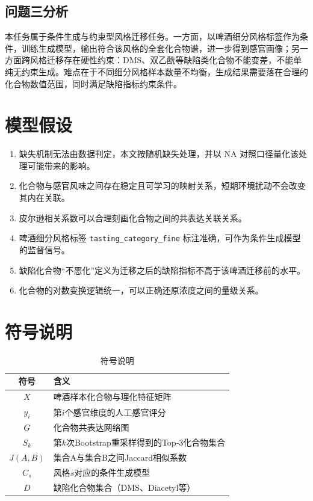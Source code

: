 \documentclass[12pt,a4paper]{article}
\begin{document}
\subsection{问题三分析}
本任务属于条件生成与约束型风格迁移任务。一方面，以啤酒细分风格标签作为条件，训练生成模型，输出符合该风格的全套化合物谱，进一步得到感官画像；另一方面跨风格迁移存在硬性约束：DMS、双乙酰等缺陷类化合物不能变差，不能单纯无约束生成。难点在于不同细分风格样本数量不均衡，生成结果需要落在合理的化合物数值范围，同时满足缺陷指标约束条件。

\section{模型假设}
\begin{enumerate}[label=\arabic*.,leftmargin=2.5em]
    \item 缺失机制无法由数据判定，本文按随机缺失处理，并以 NA 对照口径量化该处理可能带来的影响。
    \item 化合物与感官风味之间存在稳定且可学习的映射关系，短期环境扰动不会改变其内在关联。
    \item 皮尔逊相关系数可以合理刻画化合物之间的共表达关联关系。
    \item 啤酒细分风格标签 \texttt{tasting\_category\_fine} 标注准确，可作为条件生成模型的监督信号。
    \item 缺陷化合物``不恶化''定义为迁移之后的缺陷指标不高于该啤酒迁移前的水平。
    \item 化合物的对数变换逻辑统一，可以正确还原浓度之间的量级关系。
\end{enumerate}

\section{符号说明}
\begin{table}[htbp]
    \centering
    \begin{tabular}{c p{7cm}}
        \toprule
        符号 & 含义 \\
        \midrule
        $X$ & 啤酒样本化合物与理化特征矩阵 \\
        $y_i$ & 第$i$个感官维度的人工感官评分 \\
        $G$ & 化合物共表达网络图 \\
        $S_k$ & 第$k$次Bootstrap重采样得到的Top‑3化合物集合 \\
        $J(A,B)$ & 集合A与集合B之间Jaccard相似系数 \\
        $C_s$ & 风格$s$对应的条件生成模型 \\
        $D$ & 缺陷化合物集合（DMS、Diacetyl等） \\
        \bottomrule
    \end{tabular}
    \caption{符号说明}
\end{table}
\end{document}
